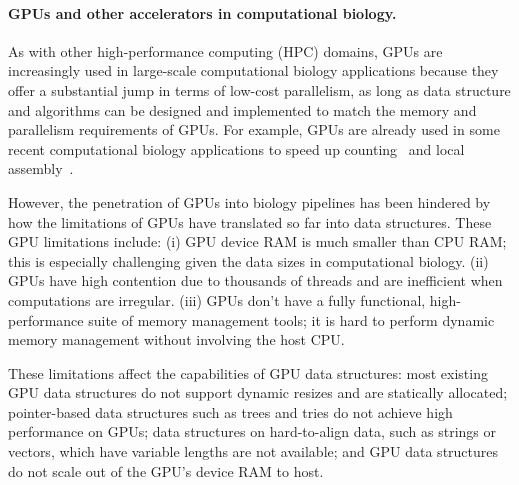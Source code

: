 \paragraph{GPUs and other accelerators in computational biology.}
As with other high-performance computing (HPC) domains,
GPUs are increasingly used in large-scale computational biology applications because they offer a substantial jump in terms of low-cost parallelism, as long as data structure and algorithms can be designed and implemented to match the memory and parallelism requirements of GPUs.
%
For example, GPUs are already used in some recent computational biology applications to speed up \kmer counting~\cite{nisa2021distributed} and local assembly~\cite{awan2021accelerating}.

However, the penetration of GPUs into biology pipelines has been hindered by how the limitations of GPUs have translated so far into data structures.  These GPU limitations include: (i) GPU device RAM is much smaller than CPU RAM\@; this is especially
challenging given the data sizes in computational biology. (ii) GPUs have high contention due to thousands of threads and are
inefficient when computations are irregular. (iii) GPUs don't have a fully functional, high-performance suite of memory management tools; it is hard to perform dynamic memory management without involving the host CPU\@. 

These limitations affect the capabilities of GPU data structures: most existing GPU data structures do not support dynamic resizes and are statically allocated; pointer-based data structures such as trees and tries do not achieve high performance on GPUs; data structures on hard-to-align data, such as strings or vectors, which have variable lengths are not available; and GPU data structures do not scale out of the GPU's device RAM to host.

